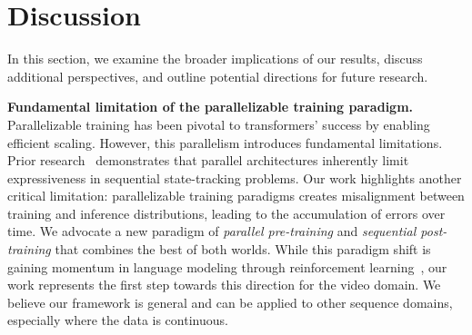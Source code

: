 \documentclass{article}
\begin{document}
\section{Discussion}
\label{sec:discussion}
In this section, we examine the broader implications of our results, discuss additional perspectives, and outline potential directions for future research.

\noindent\textbf{Fundamental limitation of the parallelizable training paradigm.} Parallelizable training has been pivotal to transformers' success by enabling efficient scaling. However, this parallelism introduces fundamental limitations.  Prior research~\cite{merrill2023parallelism} demonstrates that parallel architectures inherently limit expressiveness in sequential state-tracking problems. Our work highlights another critical limitation: parallelizable training paradigms creates misalignment between training and inference distributions, leading to the accumulation of errors over time.
We advocate a new paradigm of \textit{parallel pre-training} and \textit{sequential post-training} that combines the best of both worlds. While this paradigm shift is gaining momentum in language modeling through reinforcement learning~\cite{guo2025deepseek}, our work represents the first step towards this direction for the video domain. We believe our framework is general and can be applied to other sequence domains, especially where the data is continuous.
\end{document}

